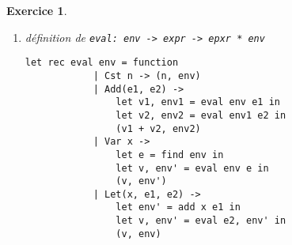 \documentclass{article}
\theoremstyle{plain}
\newtheorem{exo}{Exercice}%
\begin{document}
\begin{exo}
\begin{enumerate}
    \item définition de \verb/eval: env -> expr -> epxr * env/
    \begin{lstlisting}[frame = trBL]
        let rec eval env = function
            | Cst n -> (n, env)
            | Add(e1, e2) ->
                let v1, env1 = eval env e1 in
                let v2, env2 = eval env1 e2 in
                (v1 + v2, env2)
            | Var x ->
                let e = find env in
                let v, env' = eval env e in
                (v, env')
            | Let(x, e1, e2) ->
                let env' = add x e1 in
                let v, env' = eval e2, env' in
                (v, env)
    \end{lstlisting}
\end{enumerate}
\end{exo}
    
\end{document}
